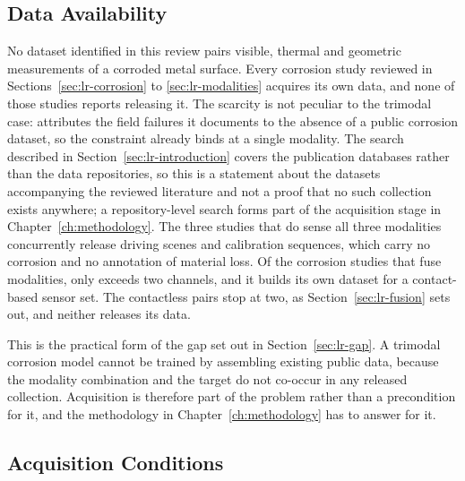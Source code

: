 \subsection{Data Availability}

No dataset identified in this review pairs visible, thermal and geometric
measurements of a corroded metal surface. Every corrosion study reviewed in
Sections~\ref{sec:lr-corrosion} to \ref{sec:lr-modalities} acquires its own
data, and none of those studies reports releasing it. The scarcity is not
peculiar to the trimodal case: \citet{Nash2022} attributes the field failures
it documents to the absence of a public corrosion dataset, so the constraint
already binds at a single modality. The search described in
Section~\ref{sec:lr-introduction} covers the publication databases rather than
the data repositories, so this is a statement about the datasets accompanying
the reviewed literature and not a proof that no such collection exists anywhere;
a repository-level search forms part of the acquisition stage in
Chapter~\ref{ch:methodology}.
The three studies that do sense all three modalities concurrently
\citep{Tran2025,Yang2024,Tran2024} release driving scenes and calibration sequences, which carry no
corrosion and no annotation of material loss. Of the corrosion studies that fuse modalities,
only \citet{Ding2025} exceeds two channels, and it builds its own dataset for a
contact-based sensor set. The contactless pairs stop at two, as
Section~\ref{sec:lr-fusion} sets out, and neither releases its data.

This is the practical form of the gap set out in Section~\ref{sec:lr-gap}. A
trimodal corrosion model cannot be trained by assembling existing public data,
because the modality combination and the target do not co-occur in any released
collection. Acquisition is therefore part of the problem rather than a
precondition for it, and the methodology in Chapter~\ref{ch:methodology} has to
answer for it.

\subsection{Acquisition Conditions}

